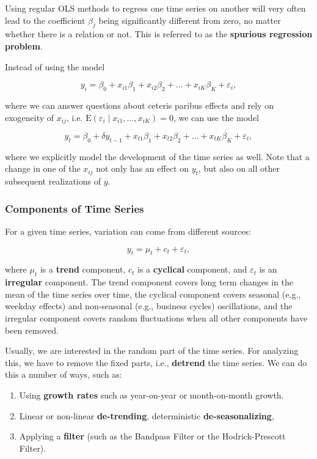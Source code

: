 Using regular OLS methods to regress one time series on another will very often lead to the coefficient $\beta_j$ being significantly different from zero, no matter whether there is a relation or not. This is referred to as the \textbf{spurious regression problem}.

Instead of using the model 

\[
	y_i = \beta_0 + x_{i1}\beta_1 + x_{i2}\beta_2 + \dots + x_{iK}\beta_K + \varepsilon_i,
\]

where we can answer questions about ceteris paribus effects and rely on exogeneity of $x_{ij}$, i.e. $\mathrm{E}(\varepsilon_i\mid x_{i1},\dots,x_{iK}) = 0$, we can use the model

\begin{equation}
	y_t = \beta_0 + \delta y_{t-1} + x_{t1}\beta_1 + x_{t2}\beta_2 + \dots + x_{tK}\beta_K + \varepsilon_t,
\end{equation}

where we explicitly model the development of the time series as well. Note that a change in one of the $x_{ij}$ not only has an effect on $y_t$, but also on all other subsequent realizations of $y$.

\subsubsection{Components of Time Series}

For a given time series, variation can come from different sources:

\begin{equation}
	y_t = \mu_t + c_t + \varepsilon_t,
\end{equation}

where $\mu_t$ is a \textbf{trend} component, $c_t$ is a \textbf{cyclical} component, and $\varepsilon_t$ is an \textbf{irregular} component. The trend component covers long term changes in the mean of the time series over time, the cyclical component covers seasonal (e.g., weekday effects) and non-seasonal (e.g., business cycles) oscillations, and the irregular component covers random fluctuations when all other components have been removed.

Usually, we are interested in the random part of the time series. For analyzing this, we have to remove the fixed parts, i.e., \textbf{detrend} the time series. We can do this a number of ways, such as:

\begin{enumerate}[label = (\arabic*)]
	\item Using \textbf{growth rates} such as year-on-year or month-on-month growth.
	\item Linear or non-linear \textbf{de-trending}, deterministic \textbf{de-seasonalizing},
	\item Applying a \textbf{filter} (such as the Bandpass Filter or the Hodrick-Prescott Filter).
\end{enumerate}

